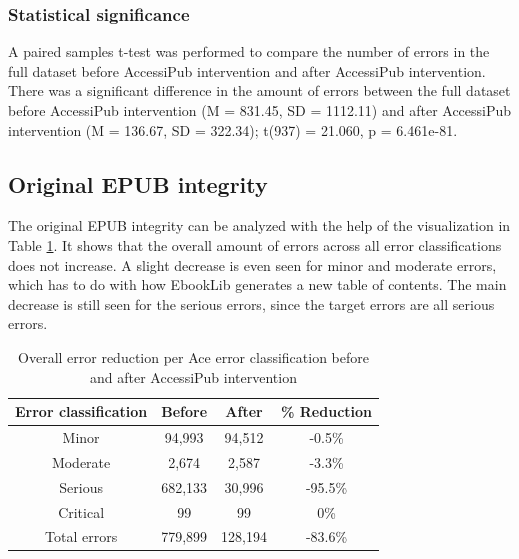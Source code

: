 \subsubsection{Statistical significance}
A paired samples t-test was performed to compare the number of errors in the full dataset before AccessiPub intervention and after AccessiPub intervention.
There was a significant difference in the amount of errors between the full dataset before AccessiPub intervention (M = 831.45, SD = 1112.11) and after AccessiPub intervention (M = 136.67, SD = 322.34); t(937) = 21.060, p = 6.461e-81.



\subsection{Original EPUB integrity}
The original EPUB integrity can be analyzed with the help of the visualization in Table \ref{table:integrity}. It shows that the overall amount of errors across all error classifications does not increase. A slight decrease is even seen for minor and moderate errors, which has to do with how EbookLib generates a new table of contents. The main decrease is still seen for the serious errors, since the target errors are all serious errors. 


\begin{table}[h!]
\small
\begin{center}
\begin{tabular}{ | c || c | c | c |} 
\hline
\textbf{Error classification} & \textbf{Before} & \textbf{After} & \textbf{\% Reduction} \\
\hline
Minor & 94,993 & 94,512 & -0.5\% \\
\hline
Moderate & 2,674 & 2,587 & -3.3\% \\
\hline
Serious & 682,133 & 30,996 & -95.5\% \\
\hline
Critical & 99 & 99 & 0\% \\
\hline
\hline
Total errors & 779,899 & 128,194 & -83.6\% \\
\hline
\end{tabular}
\end{center}
\normalsize
\caption{Overall error reduction per Ace error classification before and after AccessiPub intervention}
\label{table:integrity}
\end{table}

